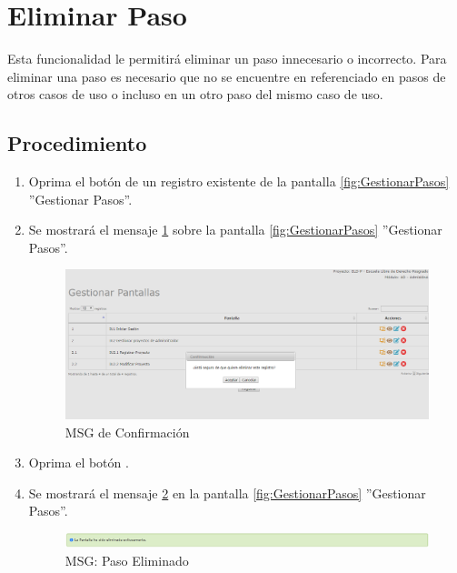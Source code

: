 \hypertarget{cv:eliminarPaso}{\section{Eliminar Paso}} \label{sec:eliminarPaso}

	Esta funcionalidad le permitirá eliminar un paso innecesario o incorrecto. Para eliminar una paso es necesario que no se encuentre en referenciado en pasos de otros casos de uso o incluso en un otro paso del mismo caso de uso.

		\subsection{Procedimiento}

			\begin{enumerate}
	
			\item Oprima el botón \IUBotonEliminar{} de un registro existente de la pantalla \ref{fig:GestionarPasos} ''Gestionar Pasos''.
	
			\item Se mostrará el mensaje \ref{fig:confirmaEliminaPaso} sobre la pantalla \ref{fig:GestionarPasos} ''Gestionar Pasos''.
			
			\begin{figure}[htbp!]
				\begin{center}
					\includegraphics[scale=0.5]{roles/lider/casosUso/pantallas/IU11-3MSG10}
					\caption{MSG de Confirmación}
					\label{fig:confirmaEliminaPaso}
				\end{center}
			\end{figure}
						
			\item Oprima el botón \IUAceptar.
			
			\item Se mostrará el mensaje \ref{fig:pasoEliminado} en la pantalla \ref{fig:GestionarPasos} ''Gestionar Pasos''.
			
			\begin{figure}[htbp!]
				\begin{center}
					\includegraphics[scale=0.5]{roles/lider/pantallas/pantallas/IU11-3MSG1}
					\caption{MSG: Paso Eliminado}
					\label{fig:pasoEliminado}
				\end{center}
			\end{figure}
			\end{enumerate}